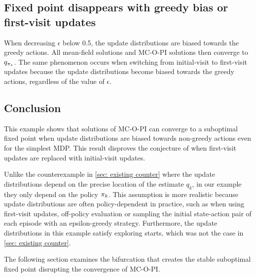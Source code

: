 \subsection{Fixed point disappears with greedy bias or first-visit updates}
\label{sec: fp disappears w greedy bias}

\vspace{-0.2cm}



When decreasing $\epsilon$ below 0.5, the update distributions are biased towards the greedy actions. All mean-field solutions and MC-O-PI solutions then converge to $q_{{\pi}_*}$.
The same phenomenon occurs when switching from initial-visit to first-visit updates because the update distributions become biased towards the greedy actions, regardless of the value of $\epsilon$.

\subsection{Conclusion}

This example shows that solutions of MC-O-PI can converge to a suboptimal fixed point when update distributions are biased towards non-greedy actions even for the simplest MDP.
This result disproves the conjecture of \citet[p.~99]{Sutton2018ReinforcementIntroduction} when first-visit updates are replaced with initial-visit updates. 

Unlike the counterexample in \autoref{sec: existing counter} where the update distributions depend on the precise location of the estimate $q_k$, in our example they only depend on the policy $\pi_k$.
This assumption is more realistic because update distributions are often policy-dependent in practice, such as when using first-visit updates, off-policy evaluation or sampling the initial state-action pair of each episode with an epsilon-greedy strategy.
Furthermore, the update distributions in this example satisfy exploring starts, which was not the case in \autoref{sec: existing counter}.

The following section examines the bifurcation that creates the stable suboptimal fixed point disrupting the convergence of MC-O-PI.


